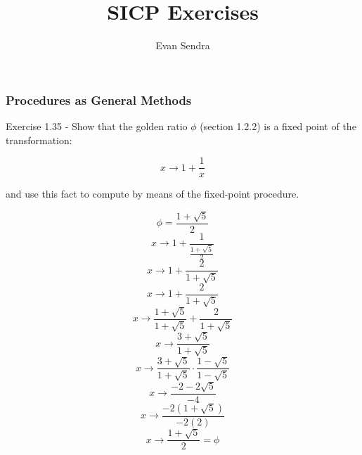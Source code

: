 \documentclass{article}
\title{SICP Exercises}
\author{Evan Sendra}
\begin{document}
\maketitle
\newpage


\section{}
\subsection{}
\subsection{}
\subsection{}
  \subsubsection{}
  \subsubsection{}
  \subsubsection{Procedures as General Methods}
  Exercise 1.35 - Show that the golden ratio $\phi$ (section 1.2.2) is a fixed point of the transformation:
  
  \[x \rightarrow 1 + \frac{1}{x}\]
  
  and use this fact to compute  by means of the fixed-point procedure.

	\newcommand{\pe}{\frac{1 + \sqrt{5}}{2}}

	\[\phi = \pe\]
  \[x \rightarrow 1 + \frac{1}{\pe}\]
  \[x \rightarrow 1 + \frac{2}{1+\sqrt{5}}\]
  \[x \rightarrow 1 + \frac{2}{1+\sqrt{5}}\]
  \[x \rightarrow \frac{1+\sqrt{5}}{1+\sqrt{5}} + \frac{2}{1+\sqrt{5}}\]
  \[x \rightarrow \frac{3+\sqrt{5}}{1+\sqrt{5}}\]
  \[x \rightarrow \frac{3+\sqrt{5}}{1+\sqrt{5}} \cdot \frac{1-\sqrt{5}}{1-\sqrt{5}}\]
  \[x \rightarrow \frac{-2-2\sqrt{5}}{-4}\]
  \[x \rightarrow \frac{-2(1+\sqrt{5})}{-2(2)}\]
  \[x \rightarrow \pe = \phi\]
\end{document}
